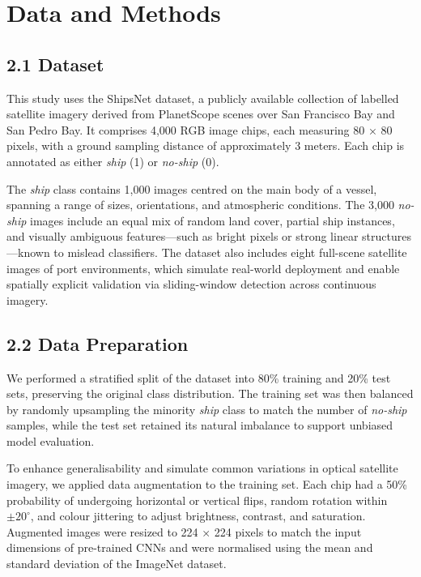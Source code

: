 \documentclass[11pt]{article}
\begin{document}
	\section*{Data and Methods}
	
	\subsection*{2.1 Dataset}
	
	This study uses the ShipsNet dataset, a publicly available collection of labelled satellite imagery derived from PlanetScope scenes over San Francisco Bay and San Pedro Bay. It comprises 4,000 RGB image chips, each measuring 80 × 80 pixels, with a ground sampling distance of approximately 3 meters. Each chip is annotated as either \textit{ship} (1) or \textit{no-ship} (0).
	
	The \textit{ship} class contains 1,000 images centred on the main body of a vessel, spanning a range of sizes, orientations, and atmospheric conditions. The 3,000 \textit{no-ship} images include an equal mix of random land cover, partial ship instances, and visually ambiguous features—such as bright pixels or strong linear structures—known to mislead classifiers. The dataset also includes eight full-scene satellite images of port environments, which simulate real-world deployment and enable spatially explicit validation via sliding-window detection across continuous imagery.
	
	\subsection*{2.2 Data Preparation}
	
	We performed a stratified split of the dataset into 80\% training and 20\% test sets, preserving the original class distribution. The training set was then balanced by randomly upsampling the minority \textit{ship} class to match the number of \textit{no-ship} samples, while the test set retained its natural imbalance to support unbiased model evaluation.
	
	To enhance generalisability and simulate common variations in optical satellite imagery, we applied data augmentation to the training set. Each chip had a 50\% probability of undergoing horizontal or vertical flips, random rotation within $\pm20^\circ$, and colour jittering to adjust brightness, contrast, and saturation. Augmented images were resized to 224 × 224 pixels to match the input dimensions of pre-trained CNNs and were normalised using the mean and standard deviation of the ImageNet dataset.
	
\end{document}
